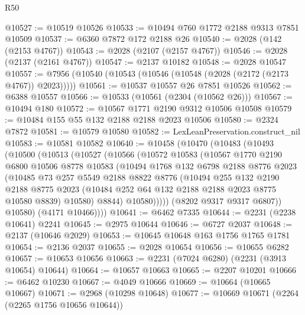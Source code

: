 \begin{lexlean}{R50}
\begin{coremodule}
@10527 := @10519 @10526
@10533 := @10494 @760 @1772 @2188 @9313 @7851 @10509
@10537 := @6360 @7872 @172 @2188 @26
@10540 := @2028 (@142 (@2153 @4767))
@10543 := @2028 (@2107 (@2157 @4767))
@10546 := @2028 (@2137 (@2161 @4767))
@10547 := @2137 @10182
@10548 := @2028 @10547
@10557 := @7956 (@10540 (@10543 (@10546 (@10548 (@2028 (@2172 (@2173 @4767)) @2023)))))
@10561 := @10537 @10557 @26 @7851 @10526
@10562 := @6388 @10557
@10566 := @10533 (@10561 (@2304 (@10562 @26)))
@10567 := @10494 @180
@10572 := @10567 @1771 @2190 @9312 @10506 @10508
@10579 := @10484 @155 @55 @132 @2188 @2188 @2023 @10506
@10580 := @2324 @7872
@10581 := @10579 @10580
@10582 := LexLeanPreservation.construct_nil
@10583 := @10581 @10582
@10640 := @10458
    (@10470
      (@10483
        (@10493
          (@10500
            (@10513
              (@10527
                (@10566
                  (@10572
                    @10583
                    (@10567
                      @1770
                      @2190
                      @6800
                      @10506
                      @8778
                      @10583
                      (@10494
                        @1768
                        @132
                        @6798
                        @2188
                        @8776
                        @2023
                        (@10485
                          @73
                          @257
                          @5549
                          @2188
                          @8822
                          @8776
                          (@10494
                            @255
                            @132
                            @2190
                            @2188
                            @8775
                            @2023
                            (@10484 @252 @64 @132 @2188 @2188 @2023 @8775 @10580 @8839)
                            @10580)
                          @8844)
                        @10580)))))
              (@8202 @9317 @9317 @6807))
            @10580)
          (@4171 @10466))))
@10641 := @6462 @7335
@10644 := @2231 (@2238 @10641) @2241
@10645 := @2975 @10644
@10646 := @6727 @2037
@10648 := @2137 (@10646 @2029)
@10653 := @10645 @10648 @163 @1756 @1765 @1781
@10654 := @2136 @2037
@10655 := @2028 @10654
@10656 := @10655 @6282
@10657 := @10653 @10656
@10663 := @2231 (@7024 @6280) (@2231 (@3913 @10654) @10644)
@10664 := @10657 @10663
@10665 := @2207 @10201
@10666 := @6462 @10230
@10667 := @4049 @10666
@10669 := @10664 (@10665 @10667)
@10671 := @2968 (@10298 @10648)
@10677 := @10669 @10671 (@2264 (@2265 @1756 @10656 @10644))

\end{coremodule}
\end{lexlean}
